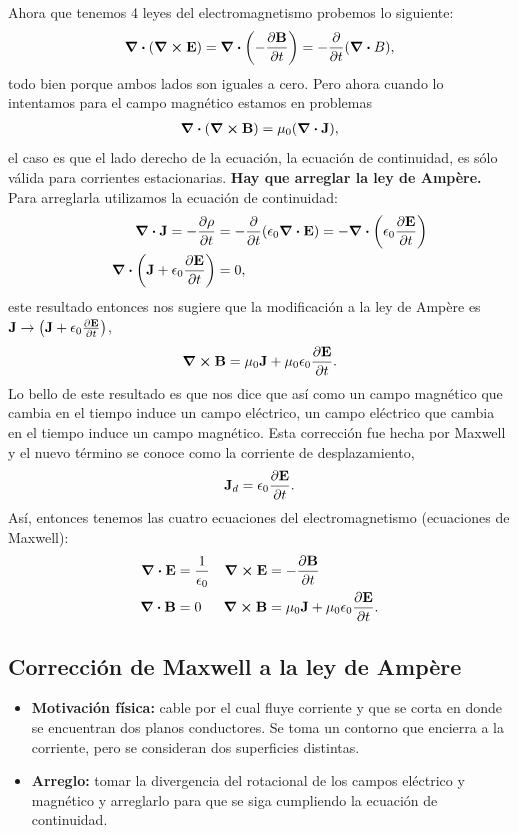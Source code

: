 Ahora que tenemos 4 leyes del electromagnetismo probemos lo siguiente:
\begin{align}
\div{\qty(\curl{\vb{E}})}=\div{\qty(-\pdv{\vb{B}}{t})}=
-\pdv{t}\qty(\div{B}),
\end{align}
todo bien porque ambos lados son iguales a cero. Pero ahora cuando 
lo intentamos para el campo magnético estamos en problemas
\begin{align}
\div{\qty(\curl{\vb{B}})}=\mu_0\qty(\div{\vb{J}}),
\end{align}
el caso es que el lado derecho de la ecuación, la ecuación de continuidad,
es sólo válida para corrientes estacionarias. \textbf{Hay que arreglar 
la ley de Ampère.} Para arreglarla utilizamos la ecuación de continuidad:
\begin{align}
\div{\vb{J}}=-\pdv{\rho}{t}&=-\pdv{t}\qty(\epsilon_0 \div{\vb{E}})=
-\div{\qty(\epsilon_0\pdv{\vb{E}}{t})}\\
\hspace{5mm} \div{\qty(\vb{J}+\epsilon_0\pdv{\vb{E}}{t})}&=0,
\end{align}
este resultado entonces nos sugiere que la modificación a la ley 
de Ampère es $\vb{J}\to \qty(\vb{J}+\epsilon_0 \pdv{\vb{E}}{t})$,
\begin{align}
\curl{\vb{B}}=\mu_0\vb{J}+\mu_0\epsilon_0 \pdv{\vb{E}}{t}.
\end{align}
Lo bello de este resultado es que nos dice que así como un campo
magnético que cambia en el tiempo induce un campo eléctrico, un 
campo eléctrico que cambia en el tiempo induce un campo magnético.
Esta corrección fue hecha por Maxwell y el nuevo término se conoce 
como la corriente de desplazamiento,
\begin{align}
\vb{J}_d=\epsilon_0 \pdv{\vb{E}}{t}.
\end{align}
Así, entonces tenemos las cuatro ecuaciones del electromagnetismo
(ecuaciones de Maxwell):
\begin{align}
\div{\vb{E}}&=\frac{1}{\epsilon_0} & \curl{\vb{E}}&=-\pdv{\vb{B}}{t}\nonumber\\
\div{\vb{B}}&=0 & \curl{\vb{B}}&=\mu_0\vb{J}+\mu_0\epsilon_0 \pdv{\vb{E}}{t}.
\end{align}

\subsection{Corrección de Maxwell a la ley de Ampère}
\begin{itemize}
\item \textbf{Motivación física:} cable por el cual fluye corriente y que
se corta en donde se encuentran dos planos conductores. Se toma un 
contorno que encierra a la corriente, pero se consideran dos superficies
distintas. 

\item \textbf{Arreglo:} tomar la divergencia del rotacional 
de los campos eléctrico y magnético y arreglarlo para que se siga 
cumpliendo la ecuación de continuidad.
\end{itemize}

